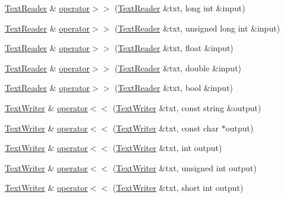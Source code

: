 \begin{DoxyCompactItemize}
\item 
\mbox{\hyperlink{classENSEM_1_1TextReader}{Text\+Reader}} \& \mbox{\hyperlink{group__io_ga7f8e9c81ef087d66a47d71decfc6456f}{operator$>$$>$}} (\mbox{\hyperlink{classENSEM_1_1TextReader}{Text\+Reader}} \&txt, long int \&input)
\item 
\mbox{\hyperlink{classENSEM_1_1TextReader}{Text\+Reader}} \& \mbox{\hyperlink{group__io_gadafd202db51d66c8ce03edc7a6cd1e0f}{operator$>$$>$}} (\mbox{\hyperlink{classENSEM_1_1TextReader}{Text\+Reader}} \&txt, unsigned long int \&input)
\item 
\mbox{\hyperlink{classENSEM_1_1TextReader}{Text\+Reader}} \& \mbox{\hyperlink{group__io_gadcd1421418b0255e88751789c70e23e4}{operator$>$$>$}} (\mbox{\hyperlink{classENSEM_1_1TextReader}{Text\+Reader}} \&txt, float \&input)
\item 
\mbox{\hyperlink{classENSEM_1_1TextReader}{Text\+Reader}} \& \mbox{\hyperlink{group__io_gaae0d5e305c1af4b3085b3a4f3b15f4e9}{operator$>$$>$}} (\mbox{\hyperlink{classENSEM_1_1TextReader}{Text\+Reader}} \&txt, double \&input)
\item 
\mbox{\hyperlink{classENSEM_1_1TextReader}{Text\+Reader}} \& \mbox{\hyperlink{group__io_ga807a1dae246fb10630e4e967d01b2e85}{operator$>$$>$}} (\mbox{\hyperlink{classENSEM_1_1TextReader}{Text\+Reader}} \&txt, bool \&input)
\item 
\mbox{\hyperlink{classENSEM_1_1TextWriter}{Text\+Writer}} \& \mbox{\hyperlink{namespaceENSEM_a970df8d2e87b8fc9353c4bb5df94b5c6}{operator$<$$<$}} (\mbox{\hyperlink{classENSEM_1_1TextWriter}{Text\+Writer}} \&txt, const string \&output)
\item 
\mbox{\hyperlink{classENSEM_1_1TextWriter}{Text\+Writer}} \& \mbox{\hyperlink{group__io_gaf097695886fb51a3d6c35f6b0bac14fc}{operator$<$$<$}} (\mbox{\hyperlink{classENSEM_1_1TextWriter}{Text\+Writer}} \&txt, const char $\ast$output)
\item 
\mbox{\hyperlink{classENSEM_1_1TextWriter}{Text\+Writer}} \& \mbox{\hyperlink{group__io_ga0dc2ec2539e29f2482b5e033daf6b013}{operator$<$$<$}} (\mbox{\hyperlink{classENSEM_1_1TextWriter}{Text\+Writer}} \&txt, int output)
\item 
\mbox{\hyperlink{classENSEM_1_1TextWriter}{Text\+Writer}} \& \mbox{\hyperlink{group__io_gafe8260aa83dc65480d323272a62f2ec0}{operator$<$$<$}} (\mbox{\hyperlink{classENSEM_1_1TextWriter}{Text\+Writer}} \&txt, unsigned int output)
\item 
\mbox{\hyperlink{classENSEM_1_1TextWriter}{Text\+Writer}} \& \mbox{\hyperlink{group__io_gab16e79cd4973872500ffbdacdc04be37}{operator$<$$<$}} (\mbox{\hyperlink{classENSEM_1_1TextWriter}{Text\+Writer}} \&txt, short int output)

\end{DoxyCompactItemize}
